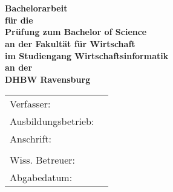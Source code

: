 \begin{titlepage}
	\begin{center}
		\vspace*{2cm}
		\LARGE\bf\myTopic\\
		\Large\rm\mySubTopic\\
		\vspace*{3cm}
		\bf Bachelorarbeit\\
		\normalsize\rm
		\vspace*{1cm}
		für die\\
		Prüfung zum Bachelor of Science\\
		\vspace*{1cm}
		an der Fakultät für Wirtschaft\\
		im Studiengang Wirtschaftsinformatik\\
		\vspace*{1cm}
		an der\\
		DHBW Ravensburg
		\vfill
	\end{center}
	\begin{tabular}{ll}
		Verfasser:&\myAutor\\
		Ausbildungsbetrieb:&\myCompany\\
		Anschrift:&\myCompanyAddressStreet\\
		&\myCompanyAddressCity\\
		Wiss. Betreuer:&\myProf\\
		Abgabedatum:&\myEndDate\\
	\end{tabular}
\end{titlepage}
\newpage
\setcounter{page}{2}
